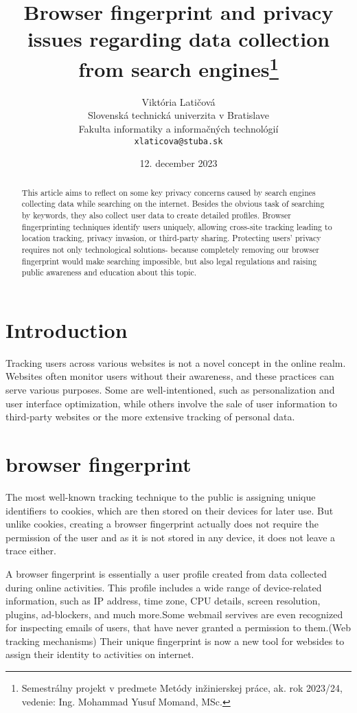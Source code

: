 \documentclass[10pt,a4paper,column]{article}
\title{Browser fingerprint and privacy issues regarding data collection from search engines\thanks{Semestrálny projekt v predmete Metódy inžinierskej práce, ak. rok 2023/24, vedenie: Ing. Mohammad Yusuf Momand, MSc.}} %
\author{Viktória Latičová\\[2pt]
	{\small Slovenská technická univerzita v Bratislave}\\
	{\small Fakulta informatiky a informačných technológií}\\
	{\small \texttt{xlaticova@stuba.sk}}
	}
\date{\small 12. december 2023} %
\begin{document}
\maketitle

\begin{abstract}
This article aims to reflect on some key privacy concerns caused by search engines collecting data while searching on the internet. Besides the obvious task of searching by keywords, they also collect user data
to create detailed profiles. Browser fingerprinting techniques identify users uniquely, allowing cross-site tracking leading to location tracking, privacy invasion, or third-party sharing. Protecting users' privacy requires not only technological solutions- because completely removing our browser fingerprint would make searching impossible, but also legal regulations and raising public awareness and education about this topic.
\end{abstract}


\section{Introduction}
Tracking users across various websites is not a novel concept in the online realm. Websites often monitor users without their awareness, and these practices can serve various purposes. Some are well-intentioned, such as personalization and user interface optimization, while others involve the sale of user information to third-party websites or the more extensive tracking of personal data.
\section{browser fingerprint} 

The most well-known tracking technique to the public is assigning unique identifiers to cookies, which are then stored on their devices for later use. But unlike cookies, creating a browser fingerprint actually does not require the permission of the user and as it is not stored in any device, it does not leave a trace either. 

A browser fingerprint is essentially a user profile created from data collected during online activities. This profile includes a wide range of device-related information, such as IP address, time zone, CPU details, screen resolution, plugins, ad-blockers, and much more.Some webmail servives are even recognized for inspecting emails of users, that have never granted a permission to them.(Web tracking mechanisms) Their unique fingerprint is now a new tool for websides to assign their identity to activities on internet. 
\end{document}
